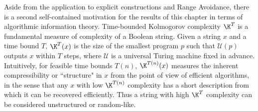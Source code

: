 Aside from the application to explicit constructions and Range Avoidance, there is a second self-contained motivation for the results of this chapter in terms of algorithmic information theory. Time-bounded Kolmogorov complexity $\K^T$ \cite{LV19} is a fundamental measure of complexity of a Boolean string. Given a string $x$ and a time bound $T$, $\K^T(x)$ is the size of the smallest program $p$ such that $\mathcal{U}(p)$ outputs $x$ within $T$ steps, where $\mathcal{U}$ is a universal Turing machine fixed in advance. Intuitively, for feasible time bounds $T(n)$, $\K^{T(n)}(x)$ measures the inherent compressibility or ``structure" in $x$ from the point of view of efficient algorithms, in the sense that any $x$ with low $\K^{T(n)}$ complexity has a short description from which it can be recovered efficiently. Thus a string with high $\K^T$ complexity can be considered unstructured or random-like.

